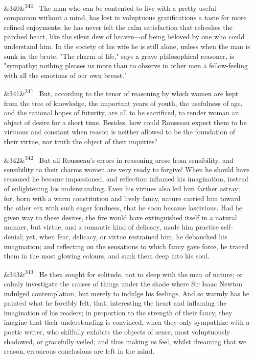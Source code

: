 \documentclass[12pt]{article}
\newcommand{\para}[1][]{\par\noindent\ifx&#1&\else\textsuperscript{\footnotesize #1}~\fi}
\begin{document}
\para[340] The man who can be contented to live with a pretty useful companion without a mind, has lost in voluptuous gratifications a taste for more refined enjoyments; he has never felt the calm satisfaction that refreshes the parched heart, like the silent dew of heaven---of being beloved by one who could understand him. In the society of his wife he is still alone, unless when the man is sunk in the brute. "The charm of life," says a grave philosophical reasoner, is "sympathy; nothing pleases us more than to observe in other men a fellow-feeling with all the emotions of our own breast."

\para[341] But, according to the tenor of reasoning by which women are kept from the tree of knowledge, the important years of youth, the usefulness of age, and the rational hopes of futurity, are all to be sacrificed, to render woman an object of desire for a short time. Besides, how could Rousseau expect them to be virtuous and constant when reason is neither allowed to be the foundation of their virtue, nor truth the object of their inquiries?

\para[342] But all Rousseau's errors in reasoning arose from sensibility, and sensibility to their charms women are very ready to forgive! When he should have reasoned he became impassioned, and reflection inflamed his imagination, instead of enlightening his understanding. Even his virtues also led him farther astray; for, born with a warm constitution and lively fancy, nature carried him toward the other sex with such eager fondness, that he soon became lascivious. Had he given way to these desires, the fire would have extinguished itself in a natural manner, but virtue, and a romantic kind of delicacy, made him practise self-denial; yet, when fear, delicacy, or virtue restrained him, he debauched his imagination; and reflecting on the sensations to which fancy gave force, he traced them in the most glowing colours, and sunk them deep into his soul.

\para[343] He then sought for solitude, not to sleep with the man of nature; or calmly investigate the causes of things under the shade where Sir Isaac Newton indulged contemplation, but merely to indulge his feelings. And so warmly has he painted what he forcibly felt, that, interesting the heart and inflaming the imagination of his readers; in proportion to the strength of their fancy, they imagine that their understanding is convinced, when they only sympathize with a poetic writer, who skilfully exhibits the objects of sense, most voluptuously shadowed, or gracefully veiled; and thus making us feel, whilst dreaming that we reason, erroneous conclusions are left in the mind.
\end{document}
